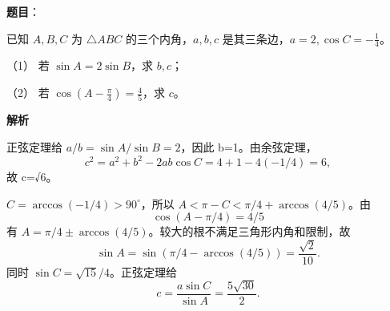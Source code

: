 \begin{answer}

\textbf{题目}：

已知 $A,B,C$ 为 $\triangle ABC$ 的三个内角，$a,b,c$ 是其三条边，$a=2,\cos C=-\frac14$。

（1） 若 $\sin A=2\sin B$，求 $b,c$；

（2） 若 $\cos(A-\frac\pi4)=\frac45$，求 $c$。

\textbf{解析}


正弦定理给 \(a/b=\sin A/\sin B=2\)，因此 b=1。由余弦定理，
\nopagebreak[4]
\[
c^2=a^2+b^2-2ab\cos C=4+1-4(-1/4)=6,
\]
故 c=√6。


\(C=\arccos(-1/4)>90^\circ\)，所以 \(A<\pi-C<\pi/4+\arccos(4/5)\)。由
\nopagebreak[4]
\[
\cos(A-\pi/4)=4/5
\]
有 \(A=\pi/4\pm\arccos(4/5)\)。较大的根不满足三角形内角和限制，故
\nopagebreak[4]
\[
\sin A=\sin(\pi/4-\arccos(4/5))=\frac{\sqrt2}{10}.
\]
同时 \(\sin C=\sqrt{15}/4\)。正弦定理给
\nopagebreak[4]
\[
c=\frac{a\sin C}{\sin A}=\frac{5\sqrt{30}}2.
\]



\end{answer}
